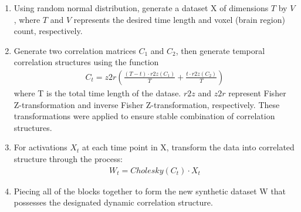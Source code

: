 \documentclass[11pt]{article}
\begin{document}
\begin{enumerate}
\item Using random normal distribution, generate a dataset X of dimensions $T$ by $V$, where $T$ and $V$ represents the desired time length and voxel (brain region) count, respectively.
\item Generate two correlation matrices $C_1$ and $C_2$, then generate temporal correlation structures using the function
\begin{align*}
C_t = z2r(\frac{(T-t) \cdot r2z(C_1)}{T} + \frac{t\cdot r2z(C_2)}{T})
\end{align*}
where T is the total time length of the datase. $r2z$ and $z2r$ represent Fisher Z-transformation and inverse Fisher Z-transformation, respectively. These transformations were applied to ensure stable combination of correlation structures.
\item For activations $X_t$ at each time point in X, transform the data into correlated structure through the process:
\begin{align*}
W_t = Cholesky(C_t) \cdot X_t
\end{align*}
\item Piecing all of the blocks together to form the new synthetic dataset W that possesses the designated dynamic correlation structure.
\end{enumerate}
\end{document}
